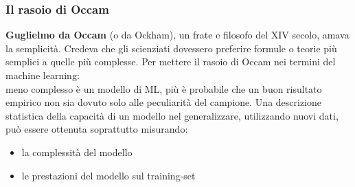 \begin{frame}

	\frametitle{Il rasoio di Occam}

	\textbf{Guglielmo da Occam} (o da Ockham), un frate e filosofo del XIV secolo, amava la semplicità. Credeva che gli scienziati dovessero preferire formule o teorie più semplici a quelle più complesse.
	\newlinedouble
	Per mettere il rasoio di Occam nei termini del machine learning:\\
	meno complesso è un modello di ML, più è probabile che un buon risultato empirico non sia dovuto solo alle peculiarità del campione.
	\newlinedouble
	\pause
	Una descrizione statistica della capacità di un modello nel generalizzare, utilizzando nuovi dati, può essere ottenuta soprattutto misurando:
	\begin{itemize}
		\item la complessità del modello
		\item le prestazioni del modello sul training-set
	\end{itemize}

\end{frame}


%
%
%
